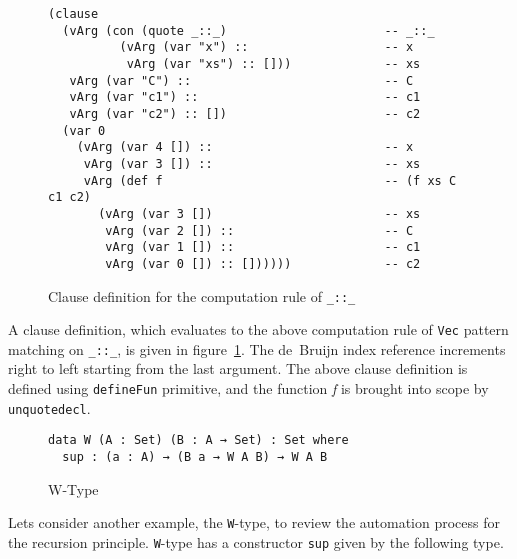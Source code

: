 \documentclass[sigplan,10pt]{acmart}
\begin{document}
\normalsize



\begin{figure}
\begin{center}
\begingroup
\fontsize{7pt}{9pt}\selectfont
\begin{Verbatim}[frame = single]
(clause
  (vArg (con (quote _::_)                      -- _::_
          (vArg (var "x") ::                   -- x
           vArg (var "xs") :: []))             -- xs
   vArg (var "C") ::                           -- C
   vArg (var "c1") ::                          -- c1
   vArg (var "c2") :: [])                      -- c2
  (var 0                                       
    (vArg (var 4 []) ::                        -- x
     vArg (var 3 []) ::                        -- xs
     vArg (def f                               -- (f xs C c1 c2)
       (vArg (var 3 [])                        -- xs
        vArg (var 2 []) ::                     -- C
        vArg (var 1 []) ::                     -- c1
        vArg (var 0 []) :: [])))))             -- c2

\end{Verbatim}
\endgroup
\end{center}
\caption{Clause definition for the computation rule of \texttt{\_::\_}}
\label{fig:ast-cdef}
\end{figure}

\normalsize

A clause definition, which evaluates to the above computation rule of {\tt Vec} pattern matching on {\tt \_::\_}, is given in figure~\ref{fig:ast-cdef}. The de~Bruijn index reference increments right to left starting from the last argument.  The above clause definition is defined using {\tt defineFun} primitive, and the function \emph{f} is brought into scope by {\tt unquotedecl}.
\begin{figure}
\begin{center}
\begingroup
\begin{BVerbatim}
data W (A : Set) (B : A → Set) : Set where
  sup : (a : A) → (B a → W A B) → W A B
\end{BVerbatim}
\endgroup
\end{center}
\caption{W-Type}
\label{fig:W-type}
\end{figure}

Lets consider another example, the {\tt W}-type, to review the automation process for the recursion principle. {\tt W}-type has a constructor {\tt sup} given by the following type.
\end{document}
